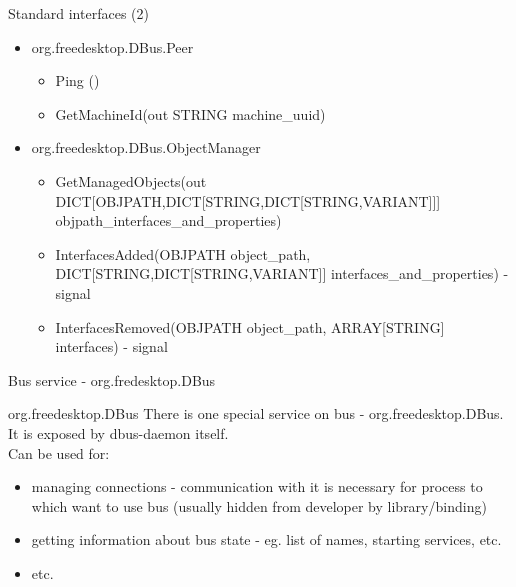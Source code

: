 \documentclass{beamer}
\begin{document}
\begin{frame}{Standard interfaces (2)}
  \begin{itemize}
  \item org.freedesktop.DBus.Peer
    \begin{itemize}
      \item Ping ()
      \item GetMachineId(out STRING machine\_uuid)
    \end{itemize}
  \item org.freedesktop.DBus.ObjectManager    
    \begin{itemize}
      \item GetManagedObjects(out DICT[OBJPATH,DICT[STRING,DICT[STRING,VARIANT]]] objpath\_interfaces\_and\_properties)
      \item InterfacesAdded(OBJPATH object\_path, DICT[STRING,DICT[STRING,VARIANT]] interfaces\_and\_properties) - signal
      \item InterfacesRemoved(OBJPATH object\_path, ARRAY[STRING] interfaces) - signal                                                
    \end{itemize}    
  \end{itemize}
\end{frame}

\begin{frame}{Bus service - org.fredesktop.DBus}
  \begin{block}{org.freedesktop.DBus}
  There is one special service on bus - org.freedesktop.DBus.\\
  It is exposed by dbus-daemon itself.\\Can be used for:\\
  \begin{itemize}
    \item managing connections - communication with it is necessary for process to which want to use bus (usually hidden from developer by library/binding)
    \item getting information about bus state - eg. list of names, starting services, etc.
    \item etc.
  \end{itemize}
  \end{block}
\end{frame}
\end{document}

